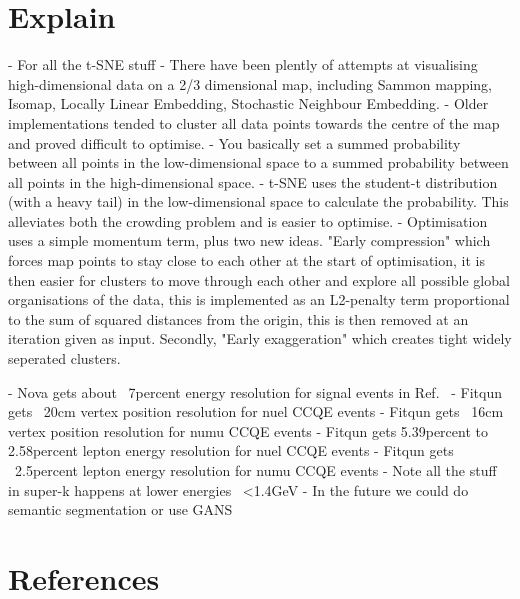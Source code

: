 \section{Explain}
- For all the t-SNE stuff
- There have been plently of attempts at visualising high-dimensional data on a 2/3 dimensional map, including Sammon mapping, Isomap, Locally Linear Embedding, Stochastic Neighbour Embedding.
- Older implementations tended to cluster all data points towards the centre of the map and proved difficult to optimise.
- You basically set a summed probability between all points in the low-dimensional space to a summed probability between all points in the high-dimensional space.
- t-SNE uses the student-t distribution (with a heavy tail) in the low-dimensional space to calculate the probability. This alleviates both the crowding problem and is easier to optimise.
- Optimisation uses a simple momentum term, plus two new ideas. "Early compression" which forces map points to stay close to each other at the start of optimisation, it is then easier for clusters to move through each other and explore all possible global organisations of the data, this is implemented as an L2-penalty term proportional to the sum of squared distances from the origin, this is then removed at an iteration given as input. Secondly, "Early exaggeration" which creates tight widely seperated clusters.


- Nova gets about ~7percent energy resolution for signal events
in Ref.~\cite{jiang2019}
- Fitqun gets ~20cm vertex position resolution for nuel CCQE events
- Fitqun gets ~16cm vertex position resolution for numu CCQE events
- Fitqun gets 5.39percent to 2.58percent lepton energy resolution for nuel CCQE events
- Fitqun gets ~2.5percent lepton energy resolution for numu CCQE events
- Note all the stuff in super-k happens at lower energies ~<1.4GeV
- In the future we could do semantic segmentation or use GANS


\section{References}

